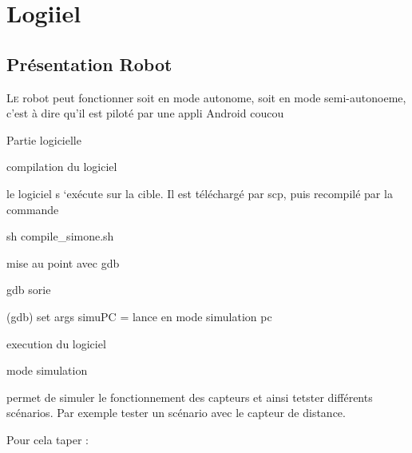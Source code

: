 \newpage

\chapter{Logiiel}
\section{Présentation Robot}
\lettrine[lines=1]{L}e robot peut fonctionner soit en mode autonome, soit en mode semi-autonoeme, c'est à dire qu'il est piloté par une appli Android
coucou



 

Partie logicielle





compilation du logiciel





le logiciel s ‘exécute sur la cible. Il est téléchargé par scp, puis recompilé par la commande

sh compile_simone.sh



mise au point avec gdb

gdb sorie

(gdb) set args simuPC = lance en mode simulation pc





execution du logiciel





mode simulation





permet de simuler le fonctionnement des capteurs et ainsi tetster différents scénarios. Par exemple tester un scénario avec le capteur de distance.

Pour cela taper :




 